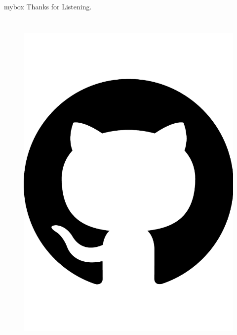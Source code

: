 \documentclass[10pt,aspectratio=43,mathserif]{beamer}
\begin{document}
\section*{}
\begin{frame}
    \begin{center}
        \begin{minipage}{1\textwidth}
            \begin{beamercolorbox}[wd=0.70\textwidth, rounded=true, shadow=true]{mybox}
                \LARGE \centering Thanks for Listening.
            \end{beamercolorbox}
        \end{minipage}
    \end{center}

    \begin{columns}

        \begin{figure}
            \centering
            \includegraphics[width=\textwidth]{source/github.pdf}
            \label{fig:github}
        \end{figure}


\end{columns}
\end{frame}
\end{document}
